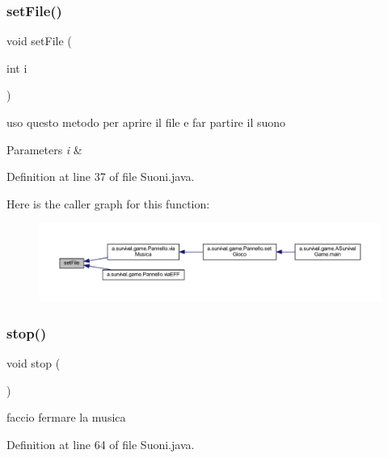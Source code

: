 \subsubsection{\texorpdfstring{set\+File()}{setFile()}}
{\footnotesize\ttfamily void set\+File (\begin{DoxyParamCaption}\item[{int}]{i }\end{DoxyParamCaption})}



uso questo metodo per aprire il file e far partire il suono 


\begin{DoxyParams}{Parameters}
{\em i} & \\
\hline
\end{DoxyParams}


Definition at line 37 of file Suoni.\+java.

Here is the caller graph for this function\+:
\nopagebreak
\begin{figure}[H]
\begin{center}
\leavevmode
\includegraphics[width=350pt]{classa_1_1survival_1_1game_1_1_suoni_ae823b8f4c288feca83157a7622d42652_icgraph}
\end{center}
\end{figure}
\mbox{\label{classa_1_1survival_1_1game_1_1_suoni_a8c528baf37154d347366083f0f816846}} 
\subsubsection{\texorpdfstring{stop()}{stop()}}
{\footnotesize\ttfamily void stop (\begin{DoxyParamCaption}{ }\end{DoxyParamCaption})}



faccio fermare la musica 



Definition at line 64 of file Suoni.\+java.

